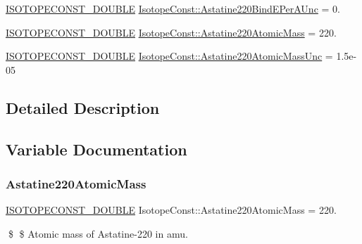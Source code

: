 \begin{DoxyCompactItemize}
\mbox{\hyperlink{group___isotope_const-_macros_ga8f45a7272ce02c0b4c65c44636ed719a}{I\+S\+O\+T\+O\+P\+E\+C\+O\+N\+S\+T\+\_\+\+D\+O\+U\+B\+LE}} \mbox{\hyperlink{group___isotope_const-_astatine-_at220_gabe8a80c5c220489014b3ec46d617bfaa}{Isotope\+Const\+::\+Astatine220\+Bind\+E\+Per\+A\+Unc}} = 0.
\item 
\mbox{\hyperlink{group___isotope_const-_macros_ga8f45a7272ce02c0b4c65c44636ed719a}{I\+S\+O\+T\+O\+P\+E\+C\+O\+N\+S\+T\+\_\+\+D\+O\+U\+B\+LE}} \mbox{\hyperlink{group___isotope_const-_astatine-_at220_ga6fd0c28e9a3618f4b41715f0d291859d}{Isotope\+Const\+::\+Astatine220\+Atomic\+Mass}} = 220.
\item 
\mbox{\hyperlink{group___isotope_const-_macros_ga8f45a7272ce02c0b4c65c44636ed719a}{I\+S\+O\+T\+O\+P\+E\+C\+O\+N\+S\+T\+\_\+\+D\+O\+U\+B\+LE}} \mbox{\hyperlink{group___isotope_const-_astatine-_at220_ga66f0819b2686b98be9faaf6fc95f7c01}{Isotope\+Const\+::\+Astatine220\+Atomic\+Mass\+Unc}} = 1.\+5e-\/05
\end{DoxyCompactItemize}


\subsection{Detailed Description}


\subsection{Variable Documentation}
\mbox{\label{group___isotope_const-_astatine-_at220_ga6fd0c28e9a3618f4b41715f0d291859d}} 
\subsubsection{\texorpdfstring{Astatine220\+Atomic\+Mass}{Astatine220AtomicMass}}
{\footnotesize\ttfamily \mbox{\hyperlink{group___isotope_const-_macros_ga8f45a7272ce02c0b4c65c44636ed719a}{I\+S\+O\+T\+O\+P\+E\+C\+O\+N\+S\+T\+\_\+\+D\+O\+U\+B\+LE}} Isotope\+Const\+::\+Astatine220\+Atomic\+Mass = 220.}

\$ \$ Atomic mass of Astatine-\/220 in amu. \mbox{\label{group___isotope_const-_astatine-_at220_ga66f0819b2686b98be9faaf6fc95f7c01}} 
